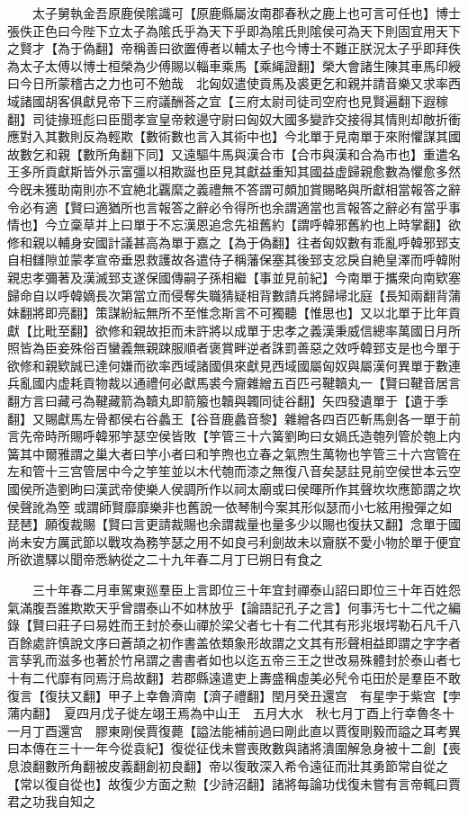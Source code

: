 　　太子舅執金吾原鹿侯隂識可【原鹿縣屬汝南郡春秋之鹿上也可言可任也】博士張佚正色曰今陛下立太子為隂氏乎為天下乎即為隂氏則隂侯可為天下則固宜用天下之賢才【為于偽翻】帝稱善曰欲置傅者以輔太子也今博士不難正朕況太子乎即拜佚為太子太傅以博士桓榮為少傅賜以輜車乘馬【乘䋲證翻】榮大會諸生陳其車馬印綬曰今日所蒙稽古之力也可不勉哉　北匈奴遣使貢馬及裘更乞和親并請音樂又求率西域諸國胡客俱獻見帝下三府議酬荅之宜【三府太尉司徒司空府也見賢遍翻下遐稼翻】司徒掾班彪曰臣聞孝宣皇帝敕邊守尉曰匈奴大國多變詐交接得其情則却敵折衝應對入其數則反為輕欺【數術數也言入其術中也】今北單于見南單于來附懼謀其國故數乞和親【數所角翻下同】又遠驅牛馬與漢合市【合市與漢和合為市也】重遣名王多所貢獻斯皆外示富彊以相欺誕也臣見其獻益重知其國益虚歸親愈數為懼愈多然今旣未獲助南則亦不宜絶北覊縻之義禮無不答謂可頗加賞賜略與所獻相當報答之辭令必有適【賢曰適猶所也言報答之辭必令得所也余謂適當也言報答之辭必有當乎事情也】今立稾草并上曰單于不忘漢恩追念先祖舊約【謂呼韓邪舊約也上時掌翻】欲修和親以輔身安國計議甚高為單于嘉之【為于偽翻】往者匈奴數有乖亂呼韓邪郅支自相讎隙並蒙孝宣帝垂恩救護故各遣侍子稱藩保塞其後郅支忿戾自絶皇澤而呼韓附親忠孝彌著及漢滅郅支遂保國傳嗣子孫相繼【事並見前紀】今南單于攜衆向南欵塞歸命自以呼韓嫡長次第當立而侵奪失職猜疑相背數請兵將歸埽北庭【長知兩翻背蒲妹翻將即亮翻】策謀紛紜無所不至惟念斯言不可獨聽【惟思也】又以北單于比年貢獻【比毗至翻】欲修和親故拒而未許將以成單于忠孝之義漢秉威信總率萬國日月所照皆為臣妾殊俗百蠻義無親踈服順者褒賞畔逆者誅罰善惡之效呼韓郅支是也今單于欲修和親欵誠已達何嫌而欲率西域諸國俱來獻見西域國屬匈奴與屬漢何異單于數連兵亂國内虚耗貢物裁以通禮何必獻馬裘今齎雜繒五百匹弓鞬韥丸一【賢曰鞬音居言翻方言曰藏弓為鞬藏箭為韥丸即箭箙也韥與韣同徒谷翻】矢四發遺單于【遺于季翻】又賜獻馬左骨都侯右谷蠡王【谷音鹿蠡音黎】雜繒各四百匹斬馬劍各一單于前言先帝時所賜呼韓邪竽瑟空侯皆敗【竽管三十六簧劉昫曰女媧氏造匏列管於匏上内簧其中爾雅謂之巢大者曰竽小者曰和竽煦也立春之氣煦生萬物也竽管三十六宫管在左和管十三宫管居中今之竽笙並以木代匏而漆之無復八音矣瑟註見前空侯世本云空國侯所造劉昫曰漢武帝使樂人侯調所作以祠太廟或曰侯暉所作其聲坎坎應節謂之坎侯聲訛為箜或謂師賢靡靡樂非也舊說一依琴制今案其形似瑟而小七絃用撥彈之如琵琶】願復裁賜【賢曰言更請裁賜也余謂裁量也量多少以賜也復扶又翻】念單于國尚未安方厲武節以戰攻為務竽瑟之用不如良弓利劍故未以齎朕不愛小物於單于便宜所欲遣驛以聞帝悉納從之二十九年春二月丁巳朔日有食之

　　三十年春二月車駕東廵羣臣上言即位三十年宜封禪泰山詔曰即位三十年百姓怨氣滿腹吾誰欺欺天乎曾謂泰山不如林放乎【論語記孔子之言】何事汚七十二代之編錄【賢曰莊子曰易姓而王封於泰山禪於梁父者七十有二代其有形兆垠堮勒石凡千八百餘處許慎說文序曰蒼頡之初作書盖依類象形故謂之文其有形聲相益即謂之字字者言孶乳而滋多也著於竹帛謂之書書者如也以迄五帝三王之世改易殊體封於泰山者七十有二代靡有同焉汙烏故翻】若郡縣遠遣吏上夀盛稱虛美必髠令屯田於是羣臣不敢復言【復扶又翻】甲子上幸魯濟南【濟子禮翻】閏月癸丑還宫　有星孛于紫宫【孛蒲内翻】　夏四月戊子徙左翊王焉為中山王　五月大水　秋七月丁酉上行幸魯冬十一月丁酉還宫　膠東剛侯賈復薨【謚法能補前過曰剛此直以賈復剛毅而謚之耳考異曰本傳在三十一年今從袁紀】復從征伐未嘗喪敗數與諸將潰圍解急身被十二創【喪息浪翻數所角翻被皮義翻創初良翻】帝以復敢深入希令遠征而壯其勇節常自從之【常以復自從也】故復少方面之勲【少詩沼翻】諸將每論功伐復未嘗有言帝輒曰賈君之功我自知之

